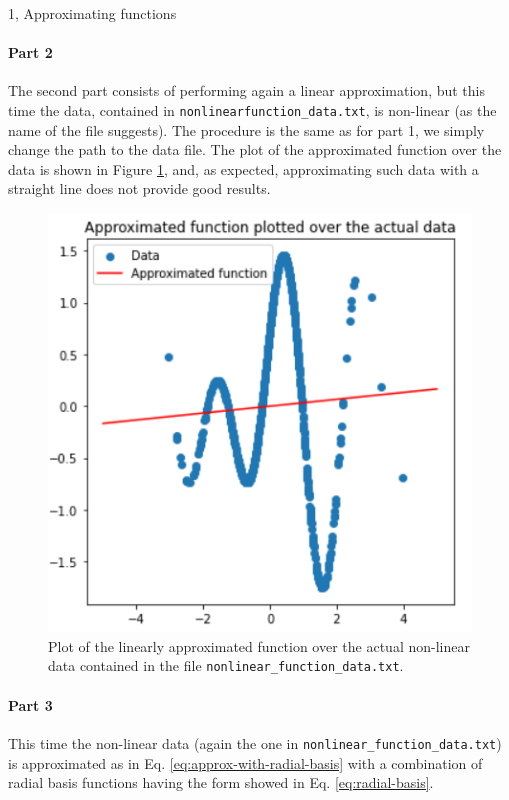 \documentclass[10pt,a4paper]{article}
\begin{document}
\begin{task}{1, Approximating functions}
\paragraph{Part 2}
The second part consists of performing again a linear approximation, but this time the data, contained in \texttt{nonlinear\-function\_data.txt}, is non-linear (as the name of the file suggests).
The procedure is the same as for part 1, we simply change the path to the data file.
The plot of the approximated function over the data is shown in Figure \ref{fig:linearly-approximated-func-over-nonlinear-data}, and, as expected, approximating such data with a straight line does not provide good results.

\begin{figure}[H]
    \centering
    \includegraphics[scale=0.8]{images/plot_linearly_approximated_func_over_nonlinear_data.png}
    \caption{Plot of the linearly approximated function over the actual non-linear data contained in the file \texttt{nonlinear\_function\_data.txt}.}
    \label{fig:linearly-approximated-func-over-nonlinear-data}
\end{figure}

\paragraph{Part 3}
This time the non-linear data (again the one in \texttt{nonlinear\_function\_data.txt}) is approximated as in Eq. \ref{eq:approx-with-radial-basis} with a combination of radial basis functions having the form showed in Eq. \ref{eq:radial-basis}.


\end{task}
\end{document}
